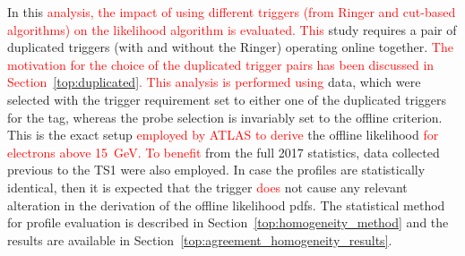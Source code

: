 In this 
\textcolor{red}{analysis, the impact of using different triggers (from Ringer and cut-based algorithms) on the likelihood algorithm is evaluated. This }
study requires a pair of duplicated triggers (with and without the Ringer) operating online together. 
\textcolor{red}{The motivation for the choice of the duplicated trigger pairs has been discussed in Section~\ref{top:duplicated}. This analysis is performed using} 
\Zee{} \tnp{} data, which were selected with the trigger requirement set to either one of the duplicated triggers for the tag, whereas the probe selection is invariably set to the offline \vloose{} criterion. This is the exact setup \textcolor{red}{employed by ATLAS to derive} the offline likelihood \textcolor{red}{for electrons above \SI{15}{\GeV}. To benefit} from the full 2017 statistics, data collected previous to the TS1 were also employed. In case the profiles are statistically identical, then it is expected that the \rnn{} trigger \textcolor{red}{does} not cause any relevant alteration in the derivation of the offline likelihood pdfs.  The statistical method for profile evaluation is described in Section~\ref{top:homogeneity_method} and the results are available in Section~\ref{top:agreement_homogeneity_results}.


